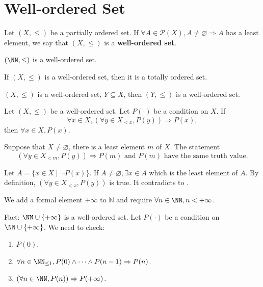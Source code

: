 \section{Well-ordered Set}
\begin{definitionenv}\label{4.7.1}
    Let $(X, \le)$ be a partially ordered set. If $\forall A\in \mathscr{P}(X), A\not=\varnothing\Rightarrow A$ has a least element, we say that $(X, \le)$ is a \textbf{well-ordered set}.
\end{definitionenv}
\begin{axiomenv}
    $(\NN, \le)$ is a well-ordered set.
\end{axiomenv}
\begin{propositionenv}
    If $(X, \le)$ is a well-ordered set,  then it is a totally ordered set.
\end{propositionenv}
\begin{propositionenv}
    $(X, \le)$ is a well-ordered set, $Y\subseteq X$,  then $(Y, \le)$ is a well-ordered set. 
\end{propositionenv}
\begin{theoremenv}
    Let $(X, \le)$ be a well-ordered set. Let $P(\cdot)$ be a condition on $X$. If 
    $$\forall x\in X, (\forall y\in X_{<x} , P(y))\Rightarrow P(x), $$
    then $\forall x\in X, P(x)$.
\end{theoremenv}
\begin{remark}
    Suppose that $X\not=\varnothing$, there is a least element $m$ of $X$. The statement
    $$ (\forall y\in X_{<m} , P(y))\Rightarrow P(m) \text{ and } P(m) \text{ have the same truth value.}$$
\end{remark}
\begin{proofenv}
    Let $A=\{x\in X\mid \neg P(x)\}$. If $A\not=\varnothing, \exists x\in A$ which is the least element of $A$. By definition,  $(\forall y\in X_{<x} , P(y))$ is true. It contradicts to .
\end{proofenv}
\begin{remark}
    We add a formal element $+\infty$ to $\mathbb{N}$ and require $\forall n\in \NN,  n<+\infty$.
\end{remark}
\begin{box2}
    Fact: $\NN \cup \{+\infty\}$ is a well-ordered set. Let $P(\cdot)$ be a condition on $\NN \cup \{+\infty\}$. We need to check:
\begin{enumerate}
    \item $P(0)$.
    \item $\forall n\in \NN_{\leq 1}, P(0)\wedge\dots\wedge P(n-1)\Rightarrow P(n)$.
    \item $(\forall n \in \NN, P(n))\Rightarrow P(+\infty)$.
\end{enumerate}
\end{box2}

